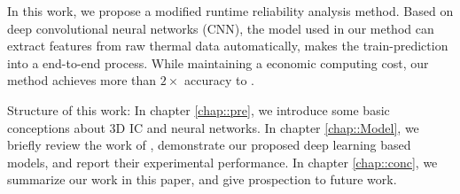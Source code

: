 In this work, we propose a modified runtime reliability analysis method.
Based on deep convolutional neural networks (CNN), the model used in our method can extract features from raw
thermal data automatically, makes the train-prediction into a end-to-end process.
While maintaining a economic computing cost, our method achieves more than $2\times$ accuracy to \cite{Zhang2016Fast}.

Structure of this work: In chapter \ref{chap::pre}, we introduce some basic conceptions about 3D IC and neural
networks. In chapter \ref{chap::Model}, we briefly review the work of \cite{Zhang2016Fast}, demonstrate
our proposed deep learning based models, and report their experimental performance.
In chapter \ref{chap::conc}, we summarize our work in this paper, and give prospection to future work.

